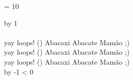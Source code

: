 \documentclass{article}
\begin{document}
    \newcount \contador

    \contador = 10
    \the\contador

    \advance \contador by 1
    \the\contador

    \newcommand{\yayloops}[1]{
        yay loops! (\the#1)
        Abacaxi Abacate Mamão ;)\\
    }

    \loop
        \paragraph*{}
        \yayloops{\contador}
        \yayloops{\contador}
        \yayloops{\contador}

        \advance \contador by -1
    \unless \ifnum \contador < 0
    \repeat    
\end{document}
